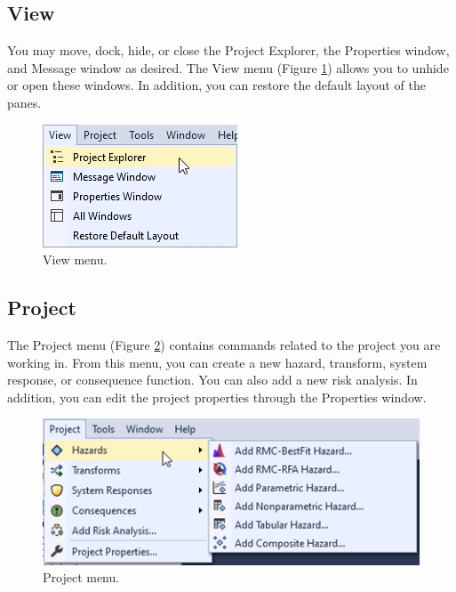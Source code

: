\documentclass[
]{book}
\begin{document}
\hypertarget{gui-menu-bar-view}{%
\subsection{View}\label{gui-menu-bar-view}}

You may move, dock, hide, or close the Project Explorer, the Properties window, and Message window as desired. The View menu (Figure \ref{fig:figure-8}) allows you to unhide or open these windows. In addition, you can restore the default layout of the panes.

\begin{figure}

{\centering \includegraphics{images/figure8} 

}

\caption{View menu.}\label{fig:figure-8}
\end{figure}

\hypertarget{gui-menu-bar-project}{%
\subsection{Project}\label{gui-menu-bar-project}}

The Project menu (Figure \ref{fig:figure-9}) contains commands related to the project you are working in. From this menu, you can create a new hazard, transform, system response, or consequence function. You can also add a new risk analysis. In addition, you can edit the project properties through the Properties window.

\begin{figure}

{\centering \includegraphics{images/figure9} 

}

\caption{Project menu.}\label{fig:figure-9}
\end{figure}
\end{document}
